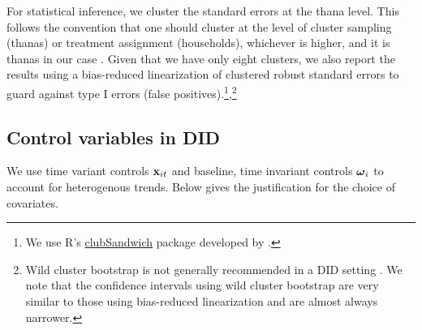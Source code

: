 \documentclass[12pt,letterpaper]{article}
\newcommand{\bfomega}{\ensuremath{\mbox{\boldmath $\omega$}}}
\newcommand{\bfx}{\ensuremath{\mbox{\bf x}}}
\newcommand{\0}{\ensuremath{\mbox{\boldmath $0$}}}
\begin{document}
For statistical inference, we cluster the standard errors at the thana level. This follows the convention that one should cluster at the level of cluster sampling (thanas) or treatment assignment (households), whichever is higher, and it is thanas in our case \citep{abadie2023should}. 
Given that we have only eight clusters, we also report the results using a bias-reduced linearization \citep[Satterthwaite correction, see][]{BellMcCaffrey2002, ImbensKolesar2016, PustejovskyTipton2018} of clustered robust standard errors to guard against type I errors (false positives).\footnote{We use R's \href{https://cran.r-project.org/web/packages/clubSandwich/vignettes/panel-data-CRVE.html}{\textsf{clubSandwich}} package developed by \citet{PustejovskyTipton2018}.},\footnote{Wild cluster bootstrap is not generally recommended in a DID setting \citep{CanaySantosShaikh2021}. We note that the confidence intervals using wild cluster bootstrap are very similar to those using bias-reduced linearization and are almost always narrower.\label{fnWCB}} 


\subsection{Control variables in DID}

We use time variant controls $\bfx_{it}$ and baseline, time invariant controls $\bfomega_{i}$ to account for heterogenous trends. Below gives the justification for the choice of covariates. 
\end{document}
